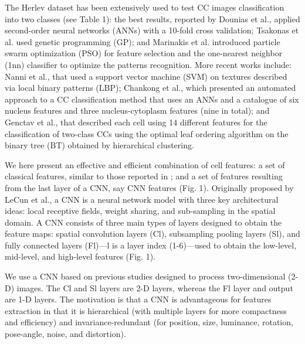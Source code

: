 \documentclass{bmcart}
\begin{document}
The Herlev dataset has been extensively used to test CC images classification into two classes \cite{2,3,5,6,8,9} (see Table 1): the best results, reported by Dounias et al.\cite{8}, applied second-order neural networks (ANNs) with a 10-fold cross validation; Tsakonas et al.\cite{3} used genetic programming (GP); and Marinakis et al.\cite{2} introduced particle swarm optimization (PSO) for feature selection and the one-nearest neighbor (1nn) classifier to optimize the patterns recognition. More recent works include: Nanni et al.\cite{9}, that used a support vector machine (SVM) on textures described via local binary patterns (LBP); Chankong et al.\cite{6}, which presented an automated approach to a CC classification method that uses an ANNs and a catalogue of six nucleus features and three nucleus-cytoplasm features (nine in total); and Genctav et al.\cite{5}, that described each cell using 14 different features\cite{1} for the classification of two-class CCs using the optimal leaf ordering algorithm on the binary tree (BT) obtained by hierarchical clustering.

We here present an effective and efficient combination of cell features: a set of classical features, similar to those reported in \cite{2,3,5,6,8,9}; and a set of features resulting from the last layer of a CNN, say CNN features (Fig. 1). Originally proposed by LeCun et al.\cite{10}, a CNN is a neural network model with three key architectural ideas: local receptive fields, weight sharing, and sub-sampling in the spatial domain. A CNN consists of three main types of layers designed to obtain the feature maps: spatial convolution layers (Cl), subsampling pooling layers (Sl), and fully connected layers (Fl)---l is a layer index (1-6)---used to obtain the low-level, mid-level, and high-level features (Fig. 1).  

We use a CNN based on previous studies designed to process two-dimensional (2-D) images\cite{11,12}. The Cl and Sl layers are 2-D layers, whereas the Fl layer and output are 1-D layers. The motivation is that a CNN is advantageous for features extraction in that it is hierarchical (with multiple layers for more compactness and efficiency) and invariance-redundant (for position, size, luminance, rotation, pose-angle, noise, and distortion). 
\end{document}
